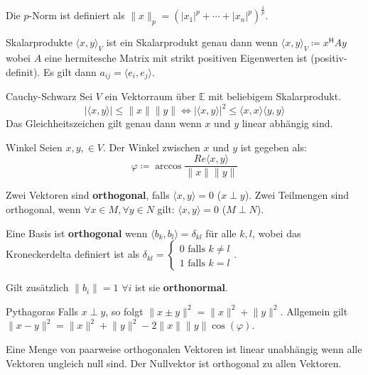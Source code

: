 \documentclass[a4paper,10pt]{article}
\newcommand*{\hermconj}{\mathsf{H}}
\begin{document}
Die $p$-Norm ist definiert als $\lVert x \rVert_p = (|x_1|^p + \cdots + |x_n|^p)^{\frac{1}{p}}$.

\begin{subbox}{Skalarprodukte}
  $\langle x, y \rangle_V$ ist ein Skalarprodukt genau dann wenn $\langle x, y \rangle_V \coloneqq x^\hermconj A y$ wobei $A$ eine hermitesche Matrix mit strikt positiven Eigenwerten ist (positiv-definit). Es gilt dann $a_{ij} = \langle e_i, e_j \rangle$.
\end{subbox}

\begin{mainbox}{Cauchy-Schwarz}
  Sei $V$ ein Vektorraum über $\mathbb{E}$ mit beliebigem Skalarprodukt.
  $$| \langle x, y \rangle | \leq \lVert x \rVert \lVert y \rVert \iff | \langle x, y \rangle |^2 \leq \langle x, x \rangle \langle y, y \rangle$$
  Das Gleichheitszeichen gilt genau dann wenn $x$ und $y$ linear abhängig sind.
\end{mainbox}

\begin{subbox}{Winkel}
  Seien $x, y, \in V$. Der Winkel zwischen $x$ und $y$ ist gegeben als:
  $$\varphi \coloneqq \arccos \frac{Re \langle x, y \rangle}{\lVert x \rVert \lVert y \rVert}$$
\end{subbox}

Zwei Vektoren sind \textbf{orthogonal}, falls $\langle x, y \rangle = 0$ ($x \perp y$). Zwei Teilmengen sind orthogonal, wenn $\forall x \in M, \forall y \in N$ gilt: $\langle x, y \rangle = 0$ ($M \perp N$).

Eine Basis ist \textbf{orthogonal} wenn $\langle b_k, b_l \rangle = \delta_{kl}$ für alle $k, l$, wobei das Kroneckerdelta definiert ist als
$\delta_{kl} = \begin{cases}
  0\text{ falls }k \neq l \\
  1\text{ falls }k = l
\end{cases}$.

Gilt zusätzlich $\lVert b_i \rVert = 1$ $\forall i$ ist sie \textbf{orthonormal}.

\begin{subbox}{Pythagoras}
  Falls $x \perp y$, so folgt $\lVert x \pm y \rVert^2 = \lVert x \rVert^2 + \lVert y \rVert^2$. Allgemein gilt $\lVert x - y \rVert^2 = \lVert x \rVert^2 + \lVert y \rVert^2 - 2 \lVert x \rVert \lVert y \rVert \cos (\varphi)$.
\end{subbox}

Eine Menge von paarweise orthogonalen Vektoren ist linear unabhängig wenn alle Vektoren ungleich null sind. Der Nullvektor ist orthogonal zu allen Vektoren.
\end{document}
